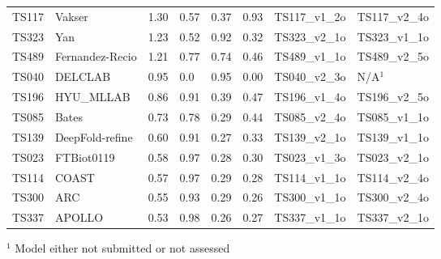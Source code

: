 \begin{table}[ht]
{\begin{tabular}{llllllll}
TS117 & Vakser & 1.30 & 0.57 & 0.37 & 0.93 & TS117\_v1\_2o & TS117\_v2\_4o \\ 
TS323 & Yan & 1.23 & 0.52 & 0.92 & 0.32 & TS323\_v2\_1o & TS323\_v1\_1o \\ 
TS489 & Fernandez-Recio & 1.21 & 0.77 & 0.74 & 0.46 & TS489\_v1\_1o & TS489\_v2\_5o \\ 
TS040 & DELCLAB & 0.95 & 0.0 & 0.95 & 0.00 & TS040\_v2\_3o & N/A$^{1}$ \\ 
TS196 & HYU\_MLLAB & 0.86 & 0.91 & 0.39 & 0.47 & TS196\_v1\_4o & TS196\_v2\_5o \\ 
TS085 & Bates & 0.73 & 0.78 & 0.29 & 0.44 & TS085\_v2\_4o & TS085\_v1\_1o \\ 
TS139 & DeepFold-refine & 0.60 & 0.91 & 0.27 & 0.33 & TS139\_v2\_1o & TS139\_v1\_1o \\ 
TS023 & FTBiot0119 & 0.58 & 0.97 & 0.28 & 0.30 & TS023\_v1\_3o & TS023\_v2\_1o \\ 
TS114 & COAST & 0.57 & 0.97 & 0.29 & 0.28 & TS114\_v1\_1o & TS114\_v2\_4o \\ 
TS300 & ARC & 0.55 & 0.93 & 0.29 & 0.26 & TS300\_v1\_1o & TS300\_v2\_4o \\ 
TS337 & APOLLO & 0.53 & 0.98 & 0.26 & 0.27 & TS337\_v1\_1o & TS337\_v2\_1o \\ 
\bottomrule
\end{tabular}%
}
\begin{flushleft}\footnotesize $^{1}$ Model either not submitted or not assessed\end{flushleft}
\end{table}
